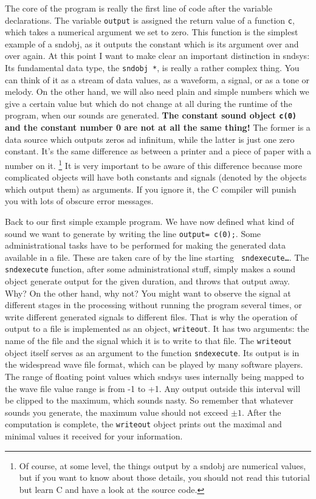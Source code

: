 \documentclass{article}
\def\s{{\sc sndsys} }
\def\sn{{\sc sndsys}}
\begin{document}
The core of the program is really the first line of code after the variable
declarations.  The variable {\tt output} is assigned the return value of a
function {\tt c}, which takes a numerical argument we set to zero.  This
function is the simplest example of a sndobj, as it outputs the constant which
is its argument over and over again.  At this point I want to make clear an
important distinction in \sn:  Its fundamental data type, the {\tt sndobj~*},
is really a rather complex thing.  You can think of it as a stream of data
values, as a waveform, a signal, or as a tone or melody.  On the other hand, we
will also need plain and simple numbers which we give a certain value but which
do not change at all during the runtime of the program, when our sounds are
generated.  {\bf The constant sound object {\tt c(0)} and the constant number 0
are not at all the same thing!}  The former is a data source which outputs
zeros ad infinitum, while the latter is just one zero constant.  It's the same
difference as between a printer and a piece of paper with a number on
it.%
%
\footnote{Of course, at some level, the things output by a sndobj are
numerical values, but if you want to know about those details, you should not
read this tutorial but learn C and have a look at the source code.}
%
It is very important to be aware of this difference because more complicated
objects will have both constants and signals (denoted by the objects which
output them) as arguments.  If you ignore it, the C compiler will punish you
with lots of obscure error messages.

Back to our first simple example program.  We have now defined what kind of
sound we want to generate by writing the line {\tt output= c(0);}.  Some
administrational tasks have to be performed for making the generated data
available in a file.  These are taken care of by the line starting {\tt
sndexecute\ldots}.  The {\tt sndexecute} function, after some administrational
stuff, simply makes a sound object generate output for the given duration, and
throws that output away.  Why?  On the other hand, why not?  You might want to
observe the signal at different stages in the processing without running the
program several times, or write different generated signals to different files.
That is why the operation of output to a file is implemented as an object,
{\tt writeout}.  It has two arguments:  the name of the file and the signal
which it is to write to that file.  The {\tt writeout} object itself serves as
an argument to the function {\tt sndexecute}.  Its output is in the widespread
wave file format, which can be played by many software players.  The range of
floating point values which \s uses internally being mapped to the wave file 
value range is from -1 to +1.  Any output outside this interval will be clipped
to the maximum, which sounds nasty.  So remember that whatever sounds you
generate, the maximum value should not exceed $\pm1$.  After the computation
is complete, the {\tt writeout} object prints out the maximal and minimal
values it received for your information.
\end{document}
